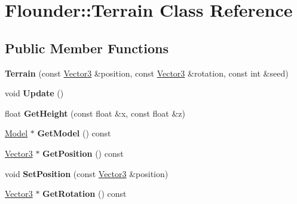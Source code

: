 \hypertarget{class_flounder_1_1_terrain}{}\section{Flounder\+:\+:Terrain Class Reference}
\label{class_flounder_1_1_terrain}
\subsection*{Public Member Functions}
\begin{DoxyCompactItemize}
\item 
\mbox{\label{class_flounder_1_1_terrain_a405edfab541441c1bf251a40dfec51b1}} 
{\bfseries Terrain} (const \hyperlink{class_flounder_1_1_vector3}{Vector3} \&position, const \hyperlink{class_flounder_1_1_vector3}{Vector3} \&rotation, const int \&seed)
\item 
\mbox{\label{class_flounder_1_1_terrain_af029251976b47bae359340bd2c346972}} 
void {\bfseries Update} ()
\item 
\mbox{\label{class_flounder_1_1_terrain_a6794d5c10fde1bf02156689950011696}} 
float {\bfseries Get\+Height} (const float \&x, const float \&z)
\item 
\mbox{\label{class_flounder_1_1_terrain_a1b10f753ff00cc0514d05aea48e29da7}} 
\hyperlink{class_flounder_1_1_model}{Model} $\ast$ {\bfseries Get\+Model} () const
\item 
\mbox{\label{class_flounder_1_1_terrain_ab76d756f929449632254430d1a8a79de}} 
\hyperlink{class_flounder_1_1_vector3}{Vector3} $\ast$ {\bfseries Get\+Position} () const
\item 
\mbox{\label{class_flounder_1_1_terrain_acb894cdc3fe5acfbd95d51c04bd5b556}} 
void {\bfseries Set\+Position} (const \hyperlink{class_flounder_1_1_vector3}{Vector3} \&position)
\item 
\mbox{\label{class_flounder_1_1_terrain_ad3cd48bd7a62131641326550fd5bc9f0}} 
\hyperlink{class_flounder_1_1_vector3}{Vector3} $\ast$ {\bfseries Get\+Rotation} () const

\end{DoxyCompactItemize}
